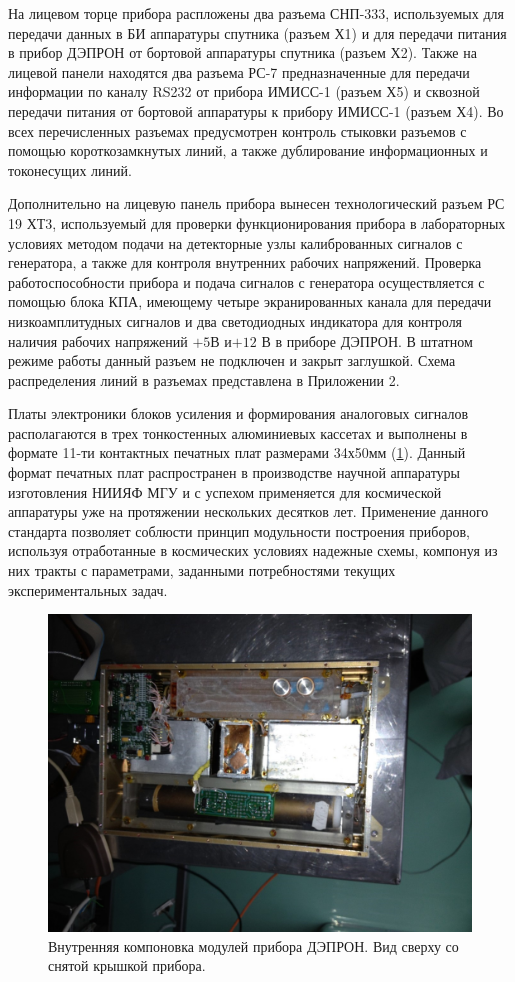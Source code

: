 На лицевом торце прибора распложены два разъема СНП-333, используемых для передачи данных в БИ аппаратуры спутника (разъем Х1) и для передачи питания в прибор ДЭПРОН от бортовой аппаратуры спутника (разъем Х2). Также на лицевой панели находятся два разъема РС-7 предназначенные для передачи информации по каналу RS232 от прибора ИМИСС-1 (разъем Х5) и сквозной передачи питания от бортовой аппаратуры к прибору ИМИСС-1 (разъем Х4). Во всех перечисленных разъемах предусмотрен контроль стыковки разъемов с помощью короткозамкнутых линий, а также дублирование информационных и токонесущих линий.


Дополнительно на лицевую панель прибора вынесен технологический разъем РС 19 ХТ3, используемый для проверки функционирования прибора в лабораторных условиях методом подачи на детекторные узлы калиброванных сигналов с генератора, а также для контроля внутренних рабочих напряжений. Проверка работоспособности прибора и подача сигналов с генератора осуществляется с помощью  блока КПА, имеющему четыре экранированных канала для передачи низкоамплитудных сигналов и два светодиодных индикатора для контроля наличия рабочих напряжений  $ +5  $В и$  +12 $ В в приборе ДЭПРОН.  В штатном режиме работы данный разъем не подключен и закрыт заглушкой. Схема распределения линий в разъемах представлена в Приложении 2.

Платы электроники блоков усиления и формирования аналоговых сигналов располагаются в трех тонкостенных алюминиевых кассетах и выполнены в формате 11-ти контактных печатных плат размерами 34х50мм (\ref{fig:Depron_inside}). Данный формат печатных плат распространен в производстве научной аппаратуры изготовления НИИЯФ МГУ и с успехом применяется для космической аппаратуры уже на протяжении нескольких десятков лет. Применение данного стандарта позволяет соблюсти принцип модульности построения приборов, используя отработанные в космических условиях надежные схемы, компонуя из них тракты с параметрами, заданными потребностями текущих экспериментальных задач. 

\begin{figure}
\centering
\includegraphics[width=0.7\linewidth]{images/Depron_inside}
\caption{Внутренняя компоновка модулей прибора ДЭПРОН. Вид сверху со снятой крышкой прибора.}
\label{fig:Depron_inside}
\end{figure}


